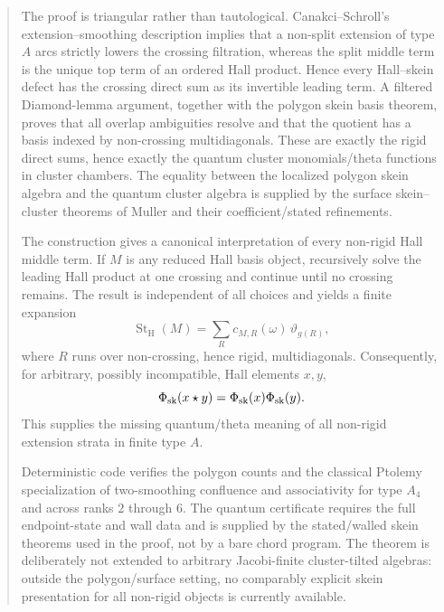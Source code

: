 \begin{abstract}
The proof is triangular rather than tautological.  Canakci--Schroll's
extension--smoothing description implies that a non-split extension of type
$A$ arcs strictly lowers the crossing filtration, whereas the split middle
term is the unique top term of an ordered Hall product.  Hence every
Hall--skein defect has the crossing direct sum as its invertible leading term.
A filtered Diamond-lemma argument, together with the polygon skein basis
theorem, proves that all overlap ambiguities resolve and that the quotient has
a basis indexed by non-crossing multidiagonals.  These are exactly the rigid
direct sums, hence exactly the quantum cluster monomials/theta functions in
cluster chambers.  The equality between the localized polygon skein algebra
and the quantum cluster algebra is supplied by the surface skein--cluster
theorems of Muller and their coefficient/stated refinements.

The construction gives a canonical interpretation of every non-rigid Hall
middle term.  If $M$ is any reduced Hall basis object, recursively solve the
leading Hall product at one crossing and continue until no crossing remains.
The result is independent of all choices and yields a finite expansion
\[
 \operatorname{St}_{\mathrm H}(M)
 =\sum_R c_{M,R}(\omega)\,\vartheta_{g(R)},
\]
where $R$ runs over non-crossing, hence rigid, multidiagonals.  Consequently,
for arbitrary, possibly incompatible, Hall elements $x,y$,
\[
 \Phi_{\rm sk}(x\star y)=\Phi_{\rm sk}(x)\Phi_{\rm sk}(y).
\]
This supplies the missing quantum/theta meaning of all non-rigid extension
strata in finite type $A$.

Deterministic code verifies the polygon counts and the classical Ptolemy
specialization of two-smoothing confluence and associativity for type $A_4$
and across ranks $2$ through $6$.  The quantum certificate requires the full
endpoint-state and wall data and is supplied by the stated/walled skein
theorems used in the proof, not by a bare chord program.  The theorem is
deliberately not extended to arbitrary Jacobi-finite cluster-tilted algebras:
outside the polygon/surface setting, no comparably explicit skein presentation
for all non-rigid objects is currently available.
\end{abstract}

